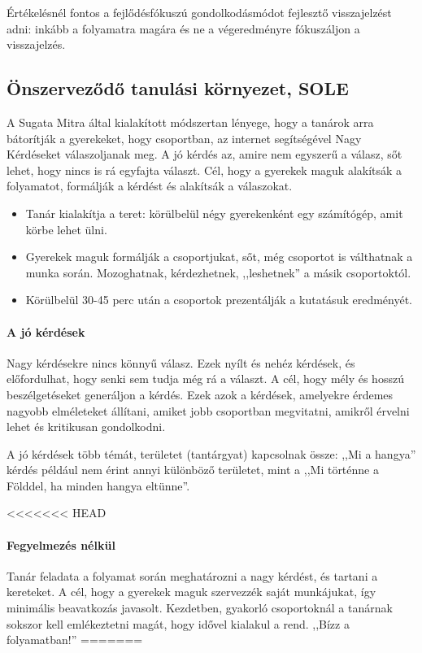 Értékelésnél fontos a fejlődésfókuszú gondolkodásmódot fejlesztő visszajelzést adni: inkább a folyamatra magára és ne a végeredményre fókuszáljon a visszajelzés.

\subsection{Önszerveződő tanulási környezet, SOLE}
A Sugata Mitra által kialakított módszertan lényege, hogy a tanárok arra bátorítják a gyerekeket, hogy csoportban, az internet segítségével Nagy Kérdéseket válaszoljanak meg. A jó kérdés az, amire nem egyszerű a válasz, sőt lehet, hogy nincs is rá egyfajta választ. Cél, hogy a gyerekek maguk alakítsák a folyamatot, formálják a kérdést és alakítsák a válaszokat.

\begin{itemize}
  \item Tanár kialakítja a teret: körülbelül négy gyerekenként egy számítógép, amit körbe lehet ülni.
  \item Gyerekek maguk formálják a csoportjukat, sőt, még csoportot is válthatnak a munka során. Mozoghatnak, kérdezhetnek, ,,leshetnek'' a másik csoportoktól.
  \item Körülbelül 30-45 perc után a csoportok prezentálják a kutatásuk eredményét.
\end{itemize}



\paragraph{A jó kérdések}
Nagy kérdésekre nincs könnyű válasz. Ezek nyílt és nehéz kérdések, és előfordulhat, hogy senki sem tudja még rá a választ. A cél, hogy mély és hosszú beszélgetéseket generáljon a kérdés. Ezek azok a kérdések, amelyekre érdemes nagyobb elméleteket állítani, amiket jobb csoportban megvitatni, amikről érvelni lehet és kritikusan gondolkodni.

A jó kérdések több témát, területet (tantárgyat) kapcsolnak össze: ,,Mi a hangya'' kérdés például nem érint annyi különböző területet, mint a ,,Mi történne a Földdel, ha minden hangya eltünne''.

<<<<<<< HEAD
\paragraph{Fegyelmezés nélkül}
Tanár feladata a folyamat során meghatározni a nagy kérdést, és tartani a kereteket. A cél, hogy a gyerekek maguk szervezzék saját munkájukat, így minimális beavatkozás javasolt. Kezdetben, gyakorló csoportoknál a tanárnak sokszor kell emlékeztetni magát, hogy idővel kialakul a rend. ,,Bízz a folyamatban!''
=======
